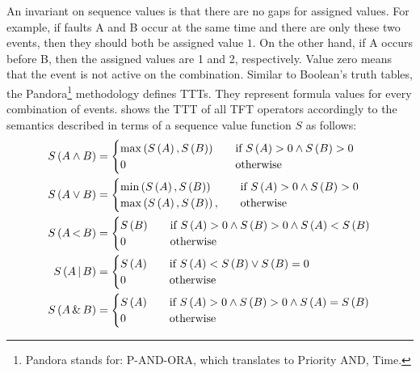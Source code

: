 \documentclass[12pt,openright,twoside,a4paper,oldfontcommands,english,brazil,draft]{abntex2}
\theoremstyle{theo}
\def\pandora{Pandora\footnote{Pandora stands for: P-AND-ORA, which translates to Priority AND, Time.}%
  \gdef\pandora{Pandora\xspace}%
  \xspace}
\newcommand{\parsin}[1]{\ensuremath\left( #1 \right)}
\def\pand{\ensuremath\operatorname{<}}
\def\por{\ensuremath\operatorname{|}}
\def\sand{\ensuremath\operatorname{\&}}
\begin{document}
An invariant on sequence values is that there are no gaps for assigned values.
For example, if faults A and B occur at the same time and there are only these two events, then they should both be assigned value $1$.
On the other hand, if A occurs before B, then the assigned values are 1 and 2, respectively.
Value zero means that the event is not active on the combination.
Similar to Boolean's truth tables, the \pandora methodology defines \acp{TTT}.
They represent formula values for every combination of events.
 shows the \ac{TTT} of all \ac{TFT} operators accordingly to the semantics described in terms of a sequence value function $S$ as follows:
%
\begin{subequations}
  \begin{align}
    S\parsin{A \land B} &=
    \begin{cases}
      \max \parsin{S\parsin{A}, S\parsin{B}} &\quad \text{if }S \parsin{A} > 0 \land S \parsin{B} > 0\\
      0 &\quad\text{otherwise}\\
    \end{cases}\\
%
    S\parsin{A \lor B} &=
    \begin{cases}
      \min \parsin{S\parsin{A}, S\parsin{B}} &\quad \text{if }S \parsin{A} > 0 \land S \parsin{B} > 0\\
      \max \parsin{S\parsin{A}, S\parsin{B}}, &\quad\text{otherwise}\\
    \end{cases}\\
%
    S\parsin{A \pand B} &=
    \begin{cases}
      S\parsin{B} &\quad \text{if }S \parsin{A} > 0 \land S \parsin{B} > 0 \land S \parsin{A} < S \parsin{B}\\
      0 &\quad\text{otherwise}\\
    \end{cases}\\
%
    S\parsin{A \por B} &=
    \begin{cases}
      S\parsin{A} &\quad \text{if } S \parsin{A} < S \parsin{B} \lor S \parsin{B} = 0\\
      0 &\quad\text{otherwise}\\
    \end{cases}\\
%
    S\parsin{A \sand B} &=
    \begin{cases}
      S\parsin{A} &\quad \text{if }S \parsin{A} > 0 \land S \parsin{B} > 0 \land S \parsin{A} = S \parsin{B}\\
      0 &\quad\text{otherwise}\\
    \end{cases}
  \end{align}
\end{subequations}
\end{document}
